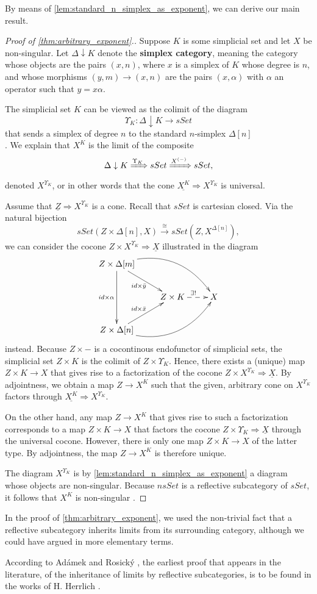 By means of \cref{lem:standard_n_simplex_as_exponent}, we can derive our main result.
\begin{proof}[Proof of \cref{thm:arbitrary_exponent}.]
Suppose $K$ is some simplicial set and let $X$ be non-singular. Let $\Delta \downarrow K$ denote the \textbf{simplex category}, meaning the category whose objects are the pairs $(x,n)$, where $x$ is a simplex of $K$ whose degree is $n$, and whose morphisms $(y,m)\to (x,n)$ are the pairs $(x,\alpha )$ with $\alpha$ an operator such that $y=x\alpha$.

The simplicial set $K$ can be viewed as the colimit of the diagram
\[\Upsilon _K:\Delta \downarrow K\to sSet\]
that sends a simplex of degree $n$ to the standard $n$-simplex $\Delta [n]$\\ \cite[Lem.~4.2.1]{FP90}. We explain that $X^K$ is the limit of the composite
\[\Delta \downarrow K\xRightarrow{\Upsilon _K} sSet\xRightarrow{X^{(-)} } sSet,\]
denoted $X^{\Upsilon _K}$, or in other words that the cone $\underline{X^K} \Rightarrow X^{\Upsilon _K}$ is universal.

Assume that $\underline{Z} \Rightarrow X^{\Upsilon _K}$ is a cone. Recall that $sSet$ is cartesian closed. Via the natural bijection
\[sSet(Z\times \Delta [n],X)\xrightarrow{\cong } sSet(Z,X^{\Delta [n]}),\]
we can consider the cocone $Z\times X^{\Upsilon _K}\Rightarrow \underline{X}$ illustrated in the diagram
\begin{displaymath}
\xymatrix{
Z\times \Delta [m] \ar[dd]_{id\times \alpha } \ar[dr]_{id\times \bar{y} } \ar@/^2pc/[drr] \\
& Z\times K \ar@{-->}[r]^{\exists !} & X \\
Z\times \Delta [n] \ar[ur]^{id\times \bar{x} } \ar@/_2pc/[urr]
}
\end{displaymath}
instead. Because $Z\times -$ is a cocontinous endofunctor of simplicial sets, the simplicial set $Z\times K$ is the colimit of $Z\times \Upsilon _K$. Hence, there exists a (unique) map $Z\times K\to X$ that gives rise to a factorization of the cocone $Z\times X^{\Upsilon _K}\Rightarrow \underline{X}$. By adjointness, we obtain a map $Z\to X^K$ such that the given, arbitrary cone on $X^{\Upsilon _K}$ factors through $\underline{X^K} \Rightarrow X^{\Upsilon _K}$.

On the other hand, any map $Z\to X^K$ that gives rise to such a factorization corresponds to a map $Z\times K\to X$ that factors the cocone $Z\times \Upsilon _K\Rightarrow \underline{X}$ through the universal cocone. However, there is only one map $Z\times K\to X$ of the latter type. By adjointness, the map $Z\to X^K$ is therefore unique.

The diagram $X^{\Upsilon _K}$ is by \cref{lem:standard_n_simplex_as_exponent} a diagram whose objects are non-singular. Because $nsSet$ is a reflective subcategory of $sSet$, it follows that $X^K$ is non-singular \cite[p.~1306]{AR15}.
\end{proof}
\noindent In the proof of \cref{thm:arbitrary_exponent}, we used the non-trivial fact that a reflective subcategory inherits limits from its surrounding category, although we could have argued in more elementary terms.

According to Adámek and Rosický \cite[p.~1306]{AR15}, the earliest proof that appears in the literature, of the inheritance of limits by reflective subcategories, is to be found in the works of H. Herrlich \cite{He68}.

